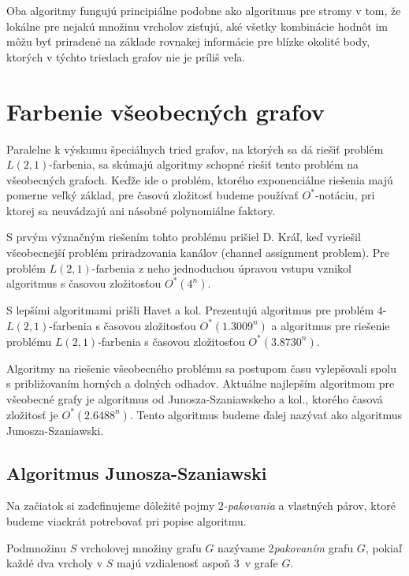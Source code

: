Oba algoritmy fungujú principiálne podobne ako algoritmus pre stromy v tom, že lokálne pre
nejakú množinu vrcholov zisťujú, aké všetky kombinácie hodnôt im môžu byť priradené na
základe rovnakej informácie pre blízke okolité body, ktorých v týchto triedach grafov nie je
príliš veľa.

\section{Farbenie všeobecných grafov}

Paralelne k výskumu špeciálnych tried grafov, na ktorých sa dá riešiť problém $L(2,1)$-farbenia,
sa skúmajú algoritmy schopné riešiť tento problém na všeobecných grafoch. Keďže ide o problém,
ktorého exponenciálne riešenia majú pomerne veľký základ, pre časovú zložitosť budeme používať
$O^*$-notáciu, pri ktorej sa neuvádzajú ani násobné polynomiálne faktory.

S prvým význačným riešením tohto problému prišiel D. Kráľ, keď vyriešil všeobecnejší problém
priradzovania kanálov (channel assignment problem). Pre problém $L(2,1)$-farbenia z neho 
jednoduchou úpravou vstupu vznikol algoritmus s časovou zložitosťou $O^*(4^n)$\cite{kral_channel}.

S lepšími algoritmami prišli Havet a kol. Prezentujú algoritmus pre problém $4$-$L(2,1)$-farbenia
s časovou zložitosťou $O^*(1.3009^n)$ a algoritmus pre riešenie problému $L(2,1)$-farbenia s
časovou zložitosťou $O^*(3.8730^n)$.

Algoritmy na riešenie všeobecného problému sa postupom času vylepšovali spolu s približovaním
horných a dolných odhadov. Aktuálne najlepším algoritmom pre všeobecné grafy je algoritmus
od Junosza-Szaniawskeho a kol., ktorého časová zložitosť je $O^*(2.6488^n)$\cite{junosza_fast}.
Tento algoritmus budeme ďalej nazývať ako algoritmus Junosza-Szaniawski.

\subsection{Algoritmus Junosza-Szaniawski}

Na začiatok si zadefinujeme dôležité pojmy $2$\emph{-pakovania} a vlastných párov, ktoré budeme
viackrát potrebovať pri popise algoritmu.

\begin{defn}
    Podmnožinu $S$ vrcholovej množiny grafu $G$ nazývame $2$\emph{pakovaním} grafu $G$, pokiaľ každé
    dva vrcholy v $S$ majú vzdialenosť aspoň $3$ v grafe $G$.
\end{defn}

